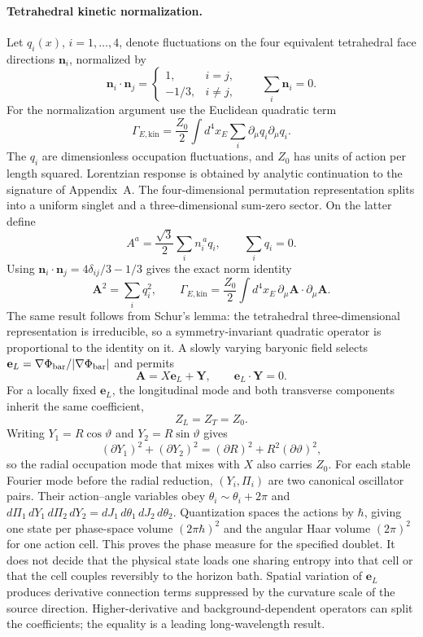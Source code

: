 \documentclass[11pt]{article}
\begin{document}
\paragraph{Tetrahedral kinetic normalization.}
Let $q_i(x)$, $i=1,\ldots,4$, denote fluctuations on the four equivalent tetrahedral face directions $\mathbf n_i$, normalized by
\[
\mathbf n_i\!\cdot\!\mathbf n_j=
\begin{cases}
1,&i=j,\\
-1/3,&i\ne j,
\end{cases}
\qquad
\sum_i\mathbf n_i=0.
\]
For the normalization argument use the Euclidean quadratic term
\[
\Gamma_{E,\mathrm{kin}}=\frac{Z_0}{2}\int d^4x_E\sum_i
\partial_\mu q_i\partial_\mu q_i.
\]
The $q_i$ are dimensionless occupation fluctuations, and $Z_0$ has units of action per length squared. Lorentzian response is obtained by analytic continuation to the signature of Appendix~A.
The four-dimensional permutation representation splits into a uniform singlet and a three-dimensional sum-zero sector. On the latter define
\[
A^a=\frac{\sqrt3}{2}\sum_i n_i^{\,a}q_i,
\qquad
\sum_iq_i=0.
\]
Using $\mathbf n_i\cdot\mathbf n_j=4\delta_{ij}/3-1/3$ gives the exact norm identity
\[
\mathbf A^2=\sum_iq_i^2,
\qquad
\Gamma_{E,\mathrm{kin}}=\frac{Z_0}{2}\int d^4x_E\,
\partial_\mu\mathbf A\cdot\partial_\mu\mathbf A.
\]
The same result follows from Schur's lemma: the tetrahedral three-dimensional representation is irreducible, so a symmetry-invariant quadratic operator is proportional to the identity on it. A slowly varying baryonic field selects $\mathbf e_L=\nabla\Phi_{\rm bar}/|\nabla\Phi_{\rm bar}|$ and permits
\[
\mathbf A=X\mathbf e_L+\mathbf Y,
\qquad
\mathbf e_L\cdot\mathbf Y=0.
\]
For a locally fixed $\mathbf e_L$, the longitudinal mode and both transverse components inherit the same coefficient,
\[
Z_L=Z_T=Z_0.
\]
Writing $Y_1=R\cos\vartheta$ and $Y_2=R\sin\vartheta$ gives
\[
(\partial Y_1)^2+(\partial Y_2)^2
=(\partial R)^2+R^2(\partial\vartheta)^2,
\]
so the radial occupation mode that mixes with $X$ also carries $Z_0$.
For each stable Fourier mode before the radial reduction, $(Y_i,\Pi_i)$ are two canonical oscillator pairs. Their action--angle variables obey $\theta_i\sim\theta_i+2\pi$ and $d\Pi_1\,dY_1\,d\Pi_2\,dY_2=dJ_1\,d\theta_1\,dJ_2\,d\theta_2$. Quantization spaces the actions by $\hbar$, giving one state per phase-space volume $(2\pi\hbar)^2$ and the angular Haar volume $(2\pi)^2$ for one action cell. This proves the phase measure for the specified doublet. It does not decide that the physical state loads one sharing entropy into that cell or that the cell couples reversibly to the horizon bath.
Spatial variation of $\mathbf e_L$ produces derivative connection terms suppressed by the curvature scale of the source direction. Higher-derivative and background-dependent operators can split the coefficients; the equality is a leading long-wavelength result.
\end{document}
